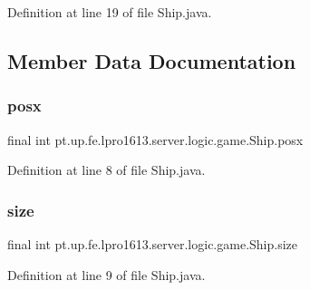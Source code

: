 Definition at line 19 of file Ship.\+java.



\subsection{Member Data Documentation}
\hypertarget{classpt_1_1up_1_1fe_1_1lpro1613_1_1server_1_1logic_1_1game_1_1_ship_a20376fae088f39d333583ac151fc0a6c}{}\label{classpt_1_1up_1_1fe_1_1lpro1613_1_1server_1_1logic_1_1game_1_1_ship_a20376fae088f39d333583ac151fc0a6c} 
\subsubsection{\texorpdfstring{posx}{posx}}
{\footnotesize\ttfamily final int pt.\+up.\+fe.\+lpro1613.\+server.\+logic.\+game.\+Ship.\+posx}



Definition at line 8 of file Ship.\+java.

\hypertarget{classpt_1_1up_1_1fe_1_1lpro1613_1_1server_1_1logic_1_1game_1_1_ship_aa966a4a795539d4ae92405b39d13bc75}{}\label{classpt_1_1up_1_1fe_1_1lpro1613_1_1server_1_1logic_1_1game_1_1_ship_aa966a4a795539d4ae92405b39d13bc75} 
\subsubsection{\texorpdfstring{size}{size}}
{\footnotesize\ttfamily final int pt.\+up.\+fe.\+lpro1613.\+server.\+logic.\+game.\+Ship.\+size}



Definition at line 9 of file Ship.\+java.

\hypertarget{classpt_1_1up_1_1fe_1_1lpro1613_1_1server_1_1logic_1_1game_1_1_ship_ace9d9d5c8d7dafd941ade2281e90687f}{}\label{classpt_1_1up_1_1fe_1_1lpro1613_1_1server_1_1logic_1_1game_1_1_ship_ace9d9d5c8d7dafd941ade2281e90687f} 
